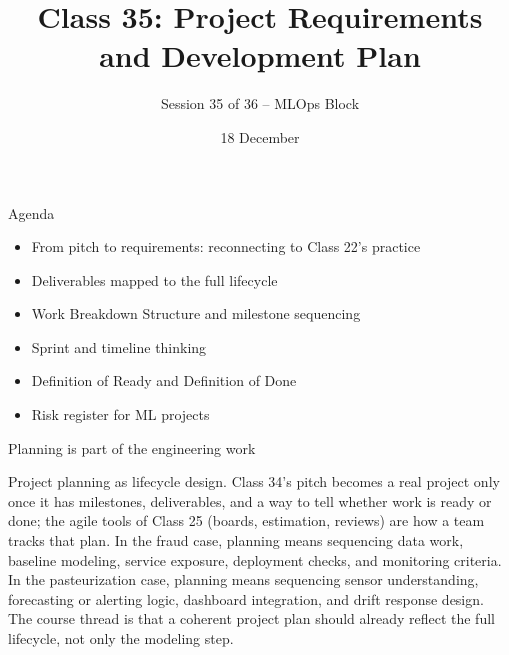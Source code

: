 

\title{Class 35: Project Requirements and Development Plan}
\subtitle{Session 35 of 36 -- MLOps Block}
\author{\coursename}
\date{18 December}



\frame{\titlepage \coursefooter}

\begin{frame}{Agenda}
\begin{itemize}
\item From pitch to requirements: reconnecting to Class 22's practice
\item Deliverables mapped to the full lifecycle
\item Work Breakdown Structure and milestone sequencing
\item Sprint and timeline thinking
\item Definition of Ready and Definition of Done
\item Risk register for ML projects
\end{itemize}
\coursefooter
\end{frame}

\begin{frame}{Planning is part of the engineering work}
\coursefooter
\end{frame}

\coursecontextframe
{Project planning as lifecycle design.}
{Class 34's pitch becomes a real project only once it has milestones, deliverables, and a way to tell whether work is ready or done; the agile tools of Class 25 (boards, estimation, reviews) are how a team tracks that plan.}
{In the fraud case, planning means sequencing data work, baseline modeling, service exposure, deployment checks, and monitoring criteria.}
{In the pasteurization case, planning means sequencing sensor understanding, forecasting or alerting logic, dashboard integration, and drift response design.}
{The course thread is that a coherent project plan should already reflect the full lifecycle, not only the modeling step.}

